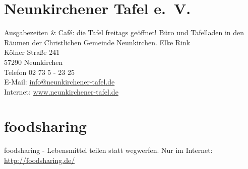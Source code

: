 \section{Neunkirchener Tafel e.~V.}
Ausgabezeiten \& Café: die Tafel freitags geöffnet! Büro und Tafelladen in den Räumen der Christlichen Gemeinde Neunkirchen.
Elke Rink\\
Kölner Straße 241 \\
57290 Neunkirchen \\
Telefon 02 73 5 - 23 25 \\ 
E-Mail: \href{mailto:info@neunkirchener-tafel.de}{info@neunkirchener-tafel.de}\\
Internet: \href{www.neunkirchener-tafel.de}{www.neunkirchener-tafel.de}

\section{foodsharing}
foodsharing - Lebensmittel teilen statt wegwerfen. Nur im Internet: \href{http://foodsharing.de/  }{http://foodsharing.de/  }